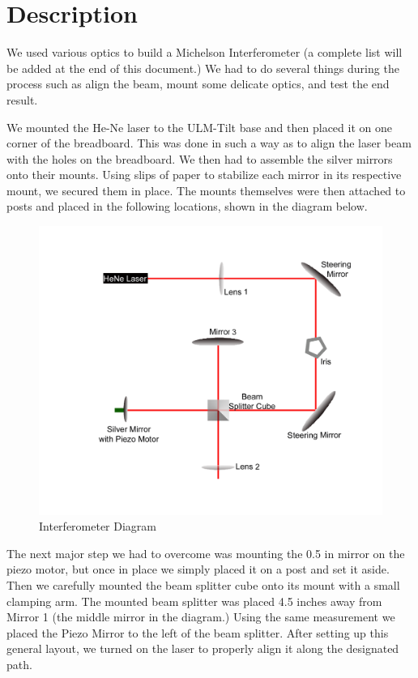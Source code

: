 \section{Description}


We used various optics to build a Michelson Interferometer (a  complete list will be added at the end of this document.) We had to do several things during the process such as align the beam, mount some delicate optics, and test the end result. 

We mounted the He-Ne laser to the ULM-Tilt base and then placed it on one corner of the breadboard. This was done in such a way as to align the laser beam with the holes on the breadboard. We then had to assemble the silver mirrors onto their mounts. Using slips of paper to stabilize each mirror in its respective mount, we secured them in place. The mounts themselves were then attached to posts and placed in the following locations, shown in the diagram below.

\begin{figure}[ht]
\centering
\includegraphics[width=5.5in]{Interferometer}
\caption{Interferometer Diagram}
\label{fig:interferometer}
\end{figure}

The next major step we had to overcome was mounting the 0.5 in mirror on the piezo motor, but once in place we simply placed it on a post and set it aside.  Then we carefully mounted the beam splitter cube onto its mount with a small clamping arm. The mounted beam splitter was placed 4.5 inches away from Mirror 1 (the middle mirror in the diagram.) Using the same measurement we placed the Piezo Mirror to the left of the beam splitter.  After setting up this general layout, we turned on the laser to properly align it along the designated path.

